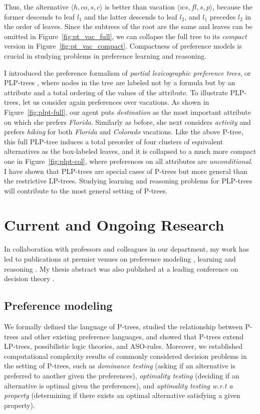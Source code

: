 \documentclass[11pt]{article}
\newcommand{\figref}[1]{Figure~\ref{fig:#1}}
\begin{document}
Thus, the alternative $\langle h, co, s, c \rangle$ is better than
vacation $\langle ws, fl, s, p\rangle$, 
because the former descends to leaf $l_1$ and the latter descends to leaf $l_2$, and $l_1$
precedes $l_2$ in the order of leaves.
Since the subtrees of the root are the same and leaves can be omitted in \figref{pt_vac_full},
we can collapse the full tree to its \textit{compact} version in \figref{pt_vac_compact}.
Compactness of preference models is
crucial in studying problems in preference learning and reasoning.

I introduced the preference formalism of \textit{partial lexicographic preference trees},
or PLP-trees \cite{LiuT:Learn_PLPTrees}, where nodes in the tree are labeled not by a formula 
but by an attribute and a total ordering of the values of the attribute.
To illustrate PLP-trees, let us consider again preferences over vacations.
As shown in \figref{plpt-full}, our agent puts \textit{destination} as the most important attribute on which
she prefers \textit{Florida}.
Similarly as before, she next considers \textit{activity} and prefers 
\textit{hiking} for both \textit{Florida} and \textit{Colorado} vacations.
Like the above P-tree, this full PLP-tree induces a total preorder of four 
clusters of equivalent alternatives as the box-labeled leaves, and it is collapsed to a
much more compact one in \figref{plpt-col}, where 
preferences on all attributes are \textit{unconditional}.
I have shown that PLP-trees are special cases of 
P-trees but more general than the restrictive LP-trees.
Studying learning and reasoning problems for PLP-trees will contribute
to the most general setting of P-trees.


\section{Current and Ongoing Research}
\noindent In collaboration with professors and colleagues in our department,
my work has led to publications at premier venues on preference modeling \cite{wsh/mpref14/LiuT,LiuT:PT}, learning
\cite{LiuT:Learn_PLPTrees} and reasoning \cite{LiuT:LPT_ASP_EA,LiuT:LPT_ASP,Spradling}.
My thesis abstract was also published at a leading conference on decision theory \cite{Liu:TA}.

\subsection{Preference modeling}
\noindent We formally defined the language of P-trees,
studied the relationship between P-trees and other existing preference languages, and
showed that P-trees extend  
LP-trees, possibilistic logic theories, and ASO-rules\cite{wsh/mpref14/LiuT,LiuT:PT}.
Moreover, we established computational complexity results of commonly considered decision
problems in the setting of P-trees, such as \textit{dominance testing} 
(asking if an alternative is preferred to another given the preferences),
\textit{optimality testing} (deciding if an alternative is optimal given the preferences), and
\textit{optimality testing w.r.t a property} (determining if there exists an optimal alternative
satisfying a given property).
\end{document}
